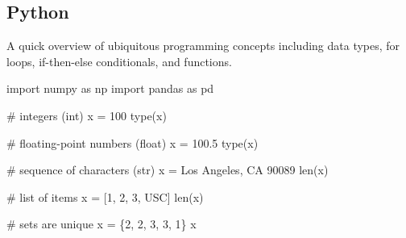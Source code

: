 \documentclass[
  letterpaper,
  DIV=11,
  numbers=noendperiod]{scrreprt}
\newenvironment{Shaded}{\begin{snugshade}}{\end{snugshade}}
\newcommand{\BuiltInTok}[1]{\textcolor[rgb]{0.00,0.23,0.31}{#1}}
\newcommand{\CommentTok}[1]{\textcolor[rgb]{0.37,0.37,0.37}{#1}}
\newcommand{\DecValTok}[1]{\textcolor[rgb]{0.68,0.00,0.00}{#1}}
\newcommand{\FloatTok}[1]{\textcolor[rgb]{0.68,0.00,0.00}{#1}}
\newcommand{\ImportTok}[1]{\textcolor[rgb]{0.00,0.46,0.62}{#1}}
\newcommand{\NormalTok}[1]{\textcolor[rgb]{0.00,0.23,0.31}{#1}}
\newcommand{\OperatorTok}[1]{\textcolor[rgb]{0.37,0.37,0.37}{#1}}
\newcommand{\StringTok}[1]{\textcolor[rgb]{0.13,0.47,0.30}{#1}}
\begin{document}
\hypertarget{python}{%
\subsection{Python}\label{python}}

A quick overview of ubiquitous programming concepts including data
types, for loops, if-then-else conditionals, and functions.

\begin{Shaded}
\begin{Highlighting}[]
\ImportTok{import}\NormalTok{ numpy }\ImportTok{as}\NormalTok{ np}
\ImportTok{import}\NormalTok{ pandas }\ImportTok{as}\NormalTok{ pd}
\end{Highlighting}
\end{Shaded}

\begin{Shaded}
\begin{Highlighting}[]
\CommentTok{\# integers (int)}
\NormalTok{x }\OperatorTok{=} \DecValTok{100}
\BuiltInTok{type}\NormalTok{(x)}
\end{Highlighting}
\end{Shaded}

\begin{Shaded}
\begin{Highlighting}[]
\CommentTok{\# floating{-}point numbers (float)}
\NormalTok{x }\OperatorTok{=} \FloatTok{100.5}
\BuiltInTok{type}\NormalTok{(x)}
\end{Highlighting}
\end{Shaded}

\begin{Shaded}
\begin{Highlighting}[]
\CommentTok{\# sequence of characters (str)}
\NormalTok{x }\OperatorTok{=} \StringTok{\textquotesingle{}Los Angeles, CA 90089\textquotesingle{}}
\BuiltInTok{len}\NormalTok{(x)}
\end{Highlighting}
\end{Shaded}

\begin{Shaded}
\begin{Highlighting}[]
\CommentTok{\# list of items}
\NormalTok{x }\OperatorTok{=}\NormalTok{ [}\DecValTok{1}\NormalTok{, }\DecValTok{2}\NormalTok{, }\DecValTok{3}\NormalTok{, }\StringTok{\textquotesingle{}USC\textquotesingle{}}\NormalTok{]}
\BuiltInTok{len}\NormalTok{(x)}
\end{Highlighting}
\end{Shaded}

\begin{Shaded}
\begin{Highlighting}[]
\CommentTok{\# sets are unique}
\NormalTok{x }\OperatorTok{=}\NormalTok{ \{}\DecValTok{2}\NormalTok{, }\DecValTok{2}\NormalTok{, }\DecValTok{3}\NormalTok{, }\DecValTok{3}\NormalTok{, }\DecValTok{1}\NormalTok{\}}
\NormalTok{x}
\end{Highlighting}
\end{Shaded}
\end{document}
